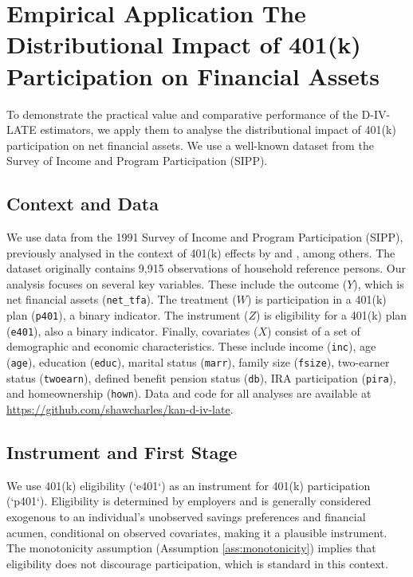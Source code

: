 \documentclass[final,3p,fleqn, 10pt]{elsarticle}
\begin{document}
\section{Empirical Application The Distributional Impact of 401(k) Participation on Financial Assets}
\label{sec:empirical_app}

To demonstrate the practical value and comparative performance of the D-IV-LATE estimators, we apply them to analyse the distributional impact of 401(k) participation on net financial assets. We use a well-known dataset from the Survey of Income and Program Participation (SIPP).

\subsection{Context and Data}
We use data from the 1991 Survey of Income and Program Participation (SIPP), previously analysed in the context of 401(k) effects by \citet{chernozhukov2004impact} and \citet{belloni2014high}, among others. The dataset originally contains 9,915 observations of household reference persons. Our analysis focuses on several key variables. These include the outcome ($Y$), which is net financial assets (\texttt{net\_tfa}). The treatment ($W$) is participation in a 401(k) plan (\texttt{p401}), a binary indicator. The instrument ($Z$) is eligibility for a 401(k) plan (\texttt{e401}), also a binary indicator. Finally, covariates ($X$) consist of a set of demographic and economic characteristics. These include income (\texttt{inc}), age (\texttt{age}), education (\texttt{educ}), marital status (\texttt{marr}), family size (\texttt{fsize}), two-earner status (\texttt{twoearn}), defined benefit pension status (\texttt{db}), IRA participation (\texttt{pira}), and homeownership (\texttt{hown}).
Data and code for all analyses are available at \url{https://github.com/shawcharles/kan-d-iv-late}.

\subsection{Instrument and First Stage}
We use 401(k) eligibility (`e401`) as an instrument for 401(k) participation (`p401`). Eligibility is determined by employers and is generally considered exogenous to an individual's unobserved savings preferences and financial acumen, conditional on observed covariates, making it a plausible instrument. The monotonicity assumption (Assumption \ref{ass:monotonicity}) implies that eligibility does not discourage participation, which is standard in this context.
\end{document}
